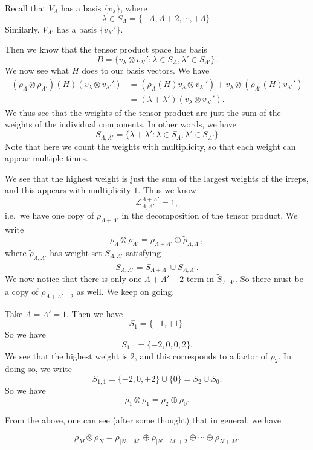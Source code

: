 \documentclass[a4paper]{article}
\begin{document}
Recall that $V_\Lambda$ has a basis $\{v_\lambda\}$, where
\[
  \lambda \in S_\Lambda = \{-\Lambda, \Lambda + 2, \cdots, + \Lambda\}.
\]
Similarly, $V_{\Lambda'}$ has a basis $\{v_{\lambda'}'\}$.

Then we know that the tensor product space has basis
\[
  B = \{v_\lambda \otimes v_{\lambda'}': \lambda \in S_{\Lambda}, \lambda' \in S_{\Lambda'}\}.
\]
We now see what $H$ does to our basis vectors. We have
\begin{align*}
  (\rho_\Lambda \otimes \rho_{\Lambda'})(H)(v_\lambda \otimes v_{\lambda'}') &= (\rho_\Lambda(H)v_\lambda \otimes v_{\lambda'}') + v_\lambda \otimes (\rho_{\Lambda'}(H)v_{\lambda'}')\\
  &= (\lambda + \lambda')(v_\lambda \otimes v_{\lambda'}').
\end{align*}
We thus see that the weights of the tensor product are just the sum of the weights of the individual components. In other words, we have
\[
  S_{\Lambda, \Lambda'} = \{\lambda + \lambda': \lambda \in S_\Lambda, \lambda' \in S_{\Lambda'}\}
\]
Note that here we count the weights with multiplicity, so that each weight can appear multiple times.

We see that the highest weight is just the sum of the largest weights of the irreps, and this appears with multiplicity $1$. Thus we know
\[
  \mathcal{L}_{\Lambda, \Lambda'}^{\Lambda + \Lambda'} = 1,
\]
i.e.\ we have one copy of $\rho_{\Lambda + \Lambda'}$ in the decomposition of the tensor product. We write
\[
  \rho_\Lambda \otimes \rho_{\Lambda'} = \rho_{\Lambda + \Lambda'} \oplus \tilde{\rho}_{\Lambda, \Lambda'},
\]
where $\tilde{\rho}_{\Lambda, \Lambda'}$ has weight set $\tilde{S}_{\Lambda, \Lambda'}$ satisfying
\[
  S_{\Lambda, \Lambda'} = S_{\Lambda + \Lambda'} \cup \tilde{S}_{\Lambda, \Lambda'}.
\]
We now notice that there is only one $\Lambda + \Lambda' - 2$ term in $\tilde{S}_{\Lambda, \Lambda'}$. So there must be a copy of $\rho_{\Lambda + \Lambda' - 2}$ as well. We keep on going.

\begin{eg}
  Take $\Lambda = \Lambda' = 1$. Then we have
  \[
    S_1 = \{-1, +1\}.
  \]
  So we have
  \[
    S_{1, 1} = \{-2, 0, 0, 2\}.
  \]
  We see that the highest weight is $2$, and this corresponds to a factor of $\rho_2$. In doing so, we write
  \[
    S_{1, 1} = \{-2, 0, +2\} \cup \{0\} = S_2 \cup S_0.
  \]
  So we have
  \[
    \rho_1 \otimes \rho_1 = \rho_2 \oplus \rho_0.
  \]
\end{eg}

From the above, one can see (after some thought) that in general, we have
\begin{prop}
  \[
    \rho_M \otimes \rho_N = \rho_{|N - M|} \oplus \rho_{|N - M| + 2} \oplus \cdots \oplus \rho_{N + M}.
  \]
\end{prop}
\end{document}
